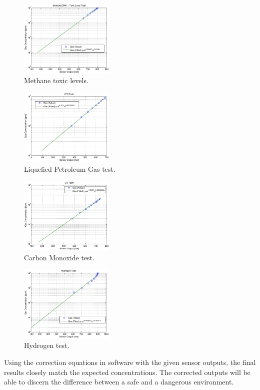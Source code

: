 \begin{figure}
	\centering
	\includegraphics[width=0.4\textwidth]{./matlab/MethaneToxic.eps}
	\caption{Methane toxic levels.}
	\label{fig:methanetoxic}
\end{figure}

\begin{figure}
	\centering
	\includegraphics[width=0.4\textwidth]{./matlab/LPG.eps}
	\caption{Liquefied Petroleum Gas test.}
	\label{fig:lpg}
\end{figure}

\begin{figure}
	\centering
	\includegraphics[width=0.4\textwidth]{./matlab/COTest1.eps}
	\caption{Carbon Monoxide test.}
	\label{fig:co}
\end{figure}

\begin{figure}
	\centering
	\includegraphics[width=0.4\textwidth]{./matlab/HydrogenTest1.eps}
	\caption{Hydrogen test.}
	\label{fig:hydrogen}
\end{figure}

Using the correction equations in software with the given sensor outputs, the final results closely match the expected concentrations. The corrected outputs will be able to discern the difference between a safe and a dangerous environment. 
